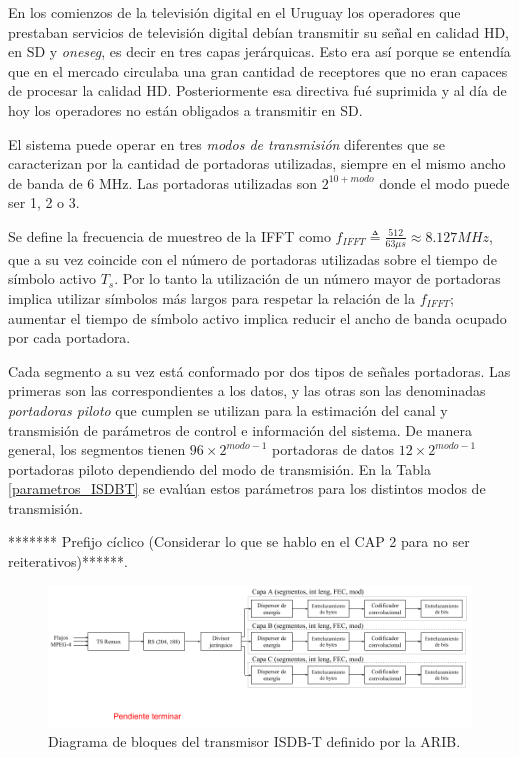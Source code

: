 En los comienzos de la televisi\'on digital en el Uruguay los operadores que prestaban servicios de televisi\'on digital deb\'ian transmitir su señal en calidad HD, en SD y \textit{oneseg}, es decir en tres capas jer\'arquicas. Esto era as\'i porque se entend\'ia que en el mercado circulaba una gran cantidad de receptores que no eran capaces de procesar la calidad HD. Posteriormente esa directiva fu\'e suprimida y al d\'ia de hoy los operadores no est\'an obligados a transmitir en SD.

El sistema puede operar en tres \textit{modos de transmisi\'on} diferentes que se caracterizan por la cantidad de portadoras utilizadas, siempre en el mismo ancho de banda de 6 MHz. Las portadoras utilizadas son $2^{10+modo}$ donde el modo puede ser 1, 2 o 3.

Se define la frecuencia de muestreo de la IFFT como $f_{IFFT} \triangleq \frac{512}{63 \mu s} \approx 8.127 MHz$, que a su vez coincide con el n\'umero de portadoras utilizadas sobre el tiempo de s\'imbolo activo $T_s$. Por lo tanto la utilizaci\'on de un n\'umero mayor de portadoras implica utilizar s\'imbolos m\'as largos para respetar la relaci\'on de la $f_{IFFT}$; aumentar el tiempo de s\'imbolo activo implica reducir el ancho de banda ocupado por cada portadora.

Cada segmento a su vez est\'a conformado por dos tipos de señales portadoras. Las primeras son las correspondientes a los datos, y las otras son las denominadas \textit{portadoras piloto} que cumplen se utilizan para la estimaci\'on del canal y transmisi\'on de par\'ametros de control e informaci\'on del sistema.
De manera general, los segmentos tienen $96 \times 2^{modo-1}$ portadoras de datos $12 \times 2^{modo-1}$ portadoras piloto dependiendo del modo de transmisi\'on. En la Tabla \ref{parametros_ISDBT} se eval\'uan estos par\'ametros para los distintos modos de transmisi\'on. 

******* Prefijo c\'iclico (Considerar lo que se hablo en el CAP 2 para no ser reiterativos)******.

\begin{figure}
\centering
\includegraphics[scale=0.55]{figuras/cap03/esquema-tx}
\caption{\label{f:esquema-tx} Diagrama de bloques del transmisor ISDB-T definido por la ARIB.}
\end{figure}


